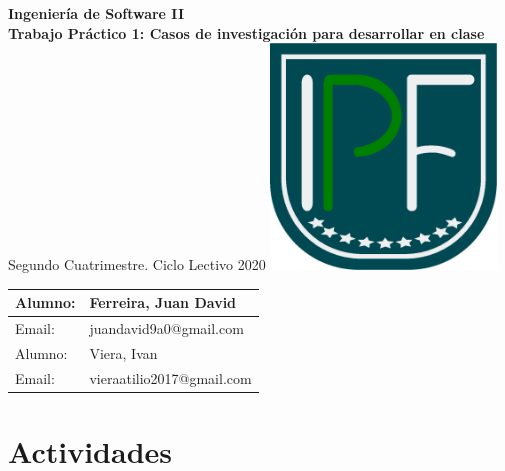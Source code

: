 \documentclass[titlepage,a4paper,twoside]{article}
\begin{document}
	\begin{titlepage}%
		\centering
		\vfill
		\Huge \textcolor{upforestgreen}{
			\textbf{Ingeniería de Software II\\
				Trabajo Práctico 1: Casos de investigación para desarrollar en clase}}
		\vskip2cm
		\Large
		Segundo Cuatrimestre. Ciclo Lectivo 2020
		\vfill
		\includegraphics[width=6cm]{LogoIPF.eps}
		\vfill
		\begin{tabular}{ | l | l | } %
			\hline
			Alumno: & Ferreira, Juan David      \\ \hline
			Email:  & juandavid9a0@gmail.com    \\ \hline
			Alumno: & Viera, Ivan               \\ \hline
			Email:  & vieraatilio2017@gmail.com \\ \hline
		\end{tabular}
		\vfill
		\vfill
	\end{titlepage}
    
    
    \tableofcontents %
    
    \newpage
    
    \section{Actividades}
    
\end{document}
